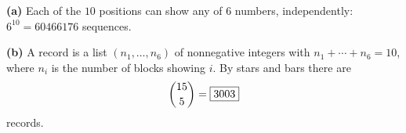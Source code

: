\textbf{(a)} Each of the $10$ positions can show any of $6$ numbers, independently: $6^{10}=\boxed{60466176}$ sequences.

\textbf{(b)} A record is a list $(n_1,\dots,n_6)$ of nonnegative integers with $n_1+\cdots+n_6=10$, where $n_i$ is the number of blocks showing $i$. By stars and bars there are
\[\dbinom{15}{5}=\boxed{3003}\]
records.
